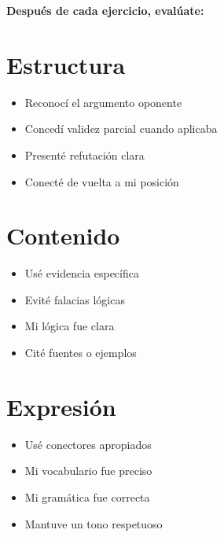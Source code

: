 \documentclass[a4paper,11pt]{article}
\begin{document}
\vspace{0.2cm}

\textbf{Después de cada ejercicio, evalúate:}

\vspace{0.2cm}

\section{Estructura}

\begin{itemize}

  \item [ ] Reconocí el argumento oponente

  \item [ ] Concedí validez parcial cuando aplicaba

  \item [ ] Presenté refutación clara

  \item [ ] Conecté de vuelta a mi posición

\end{itemize}

\vspace{0.2cm}

\section{Contenido}

\begin{itemize}

  \item [ ] Usé evidencia específica

  \item [ ] Evité falacias lógicas

  \item [ ] Mi lógica fue clara

  \item [ ] Cité fuentes o ejemplos

\end{itemize}

\vspace{0.2cm}

\section{Expresión}

\begin{itemize}

  \item [ ] Usé conectores apropiados

  \item [ ] Mi vocabulario fue preciso

  \item [ ] Mi gramática fue correcta

  \item [ ] Mantuve un tono respetuoso

\end{itemize}
\end{document}
